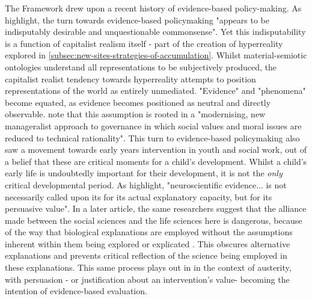 The Framework drew upon a recent history of evidence-based policy-making. As \citet[1-2]{edwards_early_2016} highlight, the turn towards evidence-based policymaking "appears to be indisputably desirable and unquestionable commonsense". Yet this indisputability is a function of capitalist realism itself - part of the creation of hyperreality explored in \ref{subsec:new-sites-strategies-of-accumulation}. Whilst material-semiotic ontologies understand all representations to be subjectively produced, the capitalist realist tendency towards hyperreality attempts to position representations of the world as entirely unmediated. "Evidence" and "phenomena" become equated, as evidence becomes positioned as neutral and directly observable. \citet[1]{edwards_early_2016} note that this assumption is rooted in a "modernising, new manageralist approach to governance in which social values and moral issues are reduced to technical rationality". This turn to evidence-based policymaking also saw a movement towards early years intervention in youth and social work, out of a belief that these are critical moments for a child's development. Whilst a child's early life is undoubtedly important for their development, it is not the \emph{only} critical developmental period. As \citet[8]{edwards_early_2016} highlight, "neuroscientific evidence... is not necessarily called upon its for its actual explanatory capacity, but for its persuasive value". In a later article, the same researchers suggest that the alliance made between the social sciences and the life sciences here is dangerous, because of the way that biological explanations are employed without the assumptions inherent within them being explored or explicated \citep{gillies_brave_2016}. This obscures alternative explanations and prevents critical reflection of the science being employed in these explanations. This same process plays out in in the context of austerity, with persuasion - or justification about an intervention's value- becoming the intention of evidence-based evaluation. 

